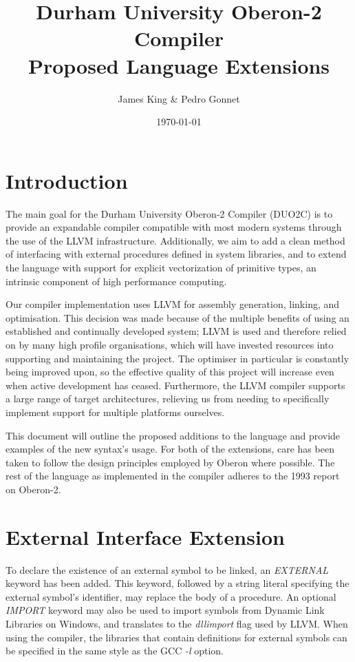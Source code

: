 \documentclass[a4paper,11pt]{article}
\title{\centering Durham University Oberon-2 Compiler \\ Proposed Language Extensions}
\date{\today}
\author{James King \& Pedro Gonnet}
\begin{document}
    \maketitle

    \section{Introduction}
    The main goal for the Durham University Oberon-2 Compiler (DUO2C) is to provide an expandable compiler compatible with most modern systems through the use of the LLVM infrastructure. Additionally, we aim to add a clean method of interfacing with external procedures defined in system libraries, and to extend the language with support for explicit vectorization of primitive types, an intrinsic component of high performance computing.

    Our compiler implementation uses LLVM for assembly generation, linking, and optimisation. This decision was made because of the multiple benefits of using an established and continually developed system; LLVM is used and therefore relied on by many high profile organisations\cite{llvmusers}, which will have invested resources into supporting and maintaining the project. The optimiser in particular is constantly being improved upon, so the effective quality of this project will increase even when active development has ceased. Furthermore, the LLVM compiler supports a large range of target architectures, relieving us from needing to specifically implement support for multiple platforms ourselves.

    This document will outline the proposed additions to the language and provide examples of the new syntax's usage. For both of the extensions, care has been taken to follow the design principles employed by Oberon where possible. The rest of the language as implemented in the compiler adheres to the 1993 report on Oberon-2\cite{oberspec}.

    \section{External Interface Extension}
    To declare the existence of an external symbol to be linked, an \emph{EXTERNAL} keyword has been added. This keyword, followed by a string literal specifying the external symbol's identifier, may replace the body of a procedure. An optional \emph{IMPORT} keyword may also be used to import symbols from Dynamic Link Libraries on Windows, and translates to the \emph{dllimport} flag used by LLVM. When using the compiler, the libraries that contain definitions for external symbols can be specified in the same style as the GCC \emph{-l} option.
\end{document}
